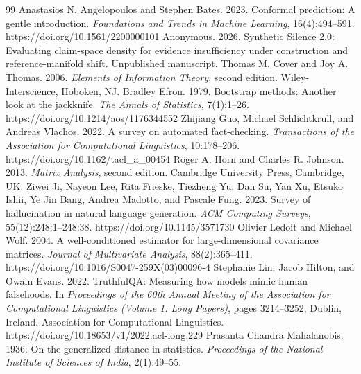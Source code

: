 \documentclass[11pt,a4paper]{article}
\begin{document}
\begin{thebibliography}{99}
Anastasios N. Angelopoulos and Stephen Bates. 2023. Conformal prediction: A gentle introduction. \textit{Foundations and Trends in Machine Learning}, 16(4):494–591. https://doi.org/10.1561/2200000101
Anonymous. 2026. Synthetic Silence 2.0: Evaluating claim-space density for evidence insufficiency under construction and reference-manifold shift. Unpublished manuscript.
Thomas M. Cover and Joy A. Thomas. 2006. \textit{Elements of Information Theory}, second edition. Wiley-Interscience, Hoboken, NJ.
Bradley Efron. 1979. Bootstrap methods: Another look at the jackknife. \textit{The Annals of Statistics}, 7(1):1–26. https://doi.org/10.1214/aos/1176344552
Zhijiang Guo, Michael Schlichtkrull, and Andreas Vlachos. 2022. A survey on automated fact-checking. \textit{Transactions of the Association for Computational Linguistics}, 10:178–206. https://doi.org/10.1162/tacl\_a\_00454
Roger A. Horn and Charles R. Johnson. 2013. \textit{Matrix Analysis}, second edition. Cambridge University Press, Cambridge, UK.
Ziwei Ji, Nayeon Lee, Rita Frieske, Tiezheng Yu, Dan Su, Yan Xu, Etsuko Ishii, Ye Jin Bang, Andrea Madotto, and Pascale Fung. 2023. Survey of hallucination in natural language generation. \textit{ACM Computing Surveys}, 55(12):248:1–248:38. https://doi.org/10.1145/3571730
Olivier Ledoit and Michael Wolf. 2004. A well-conditioned estimator for large-dimensional covariance matrices. \textit{Journal of Multivariate Analysis}, 88(2):365–411. https://doi.org/10.1016/S0047-259X(03)00096-4
Stephanie Lin, Jacob Hilton, and Owain Evans. 2022. TruthfulQA: Measuring how models mimic human falsehoods. In \textit{Proceedings of the 60th Annual Meeting of the Association for Computational Linguistics (Volume 1: Long Papers)}, pages 3214–3252, Dublin, Ireland. Association for Computational Linguistics. https://doi.org/10.18653/v1/2022.acl-long.229
Prasanta Chandra Mahalanobis. 1936. On the generalized distance in statistics. \textit{Proceedings of the National Institute of Sciences of India}, 2(1):49–55.

\end{thebibliography}
\end{document}

